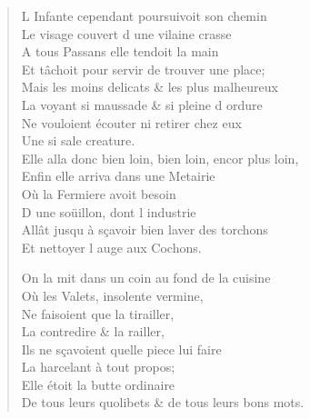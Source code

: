 \begin{verse}
L\textquotesingle{} Infante cependant poursuivoit son chemin \\
Le visage couvert d\textquotesingle{} une vilaine crasse \\
\vin A tous Passans elle tendoit la main \\
Et tâchoit pour servir de trouver une place; \\
Mais les moins delicats \& les plus malheureux \\
La voyant si maussade \& si pleine d\textquotesingle{} ordure \\
Ne vouloient écouter ni retirer chez eux \\
\vin Une si sale creature. \\
Elle alla donc bien loin, bien loin, encor plus loin, \\
Enfin elle arriva dans une Metairie \\
\vin Où la Fermiere avoit besoin \\
\vin D\textquotesingle{} une soüillon, dont l\textquotesingle{} industrie \\
Allât jusqu\textquotesingle{} à sçavoir bien laver des torchons \\
\vin Et nettoyer l\textquotesingle{} auge aux Cochons.

On la mit dans un coin au fond de la cuisine \\
\vin Où les Valets, insolente vermine, \\
\vin Ne faisoient que la tirailler, \\
\vin La contredire \& la railler, \\
\vin Ils ne sçavoient quelle piece lui faire \\
\vin La harcelant à tout propos; \\
\vin Elle étoit la butte ordinaire \\
De tous leurs quolibets \& de tous leurs bons mots.


\end{verse}
